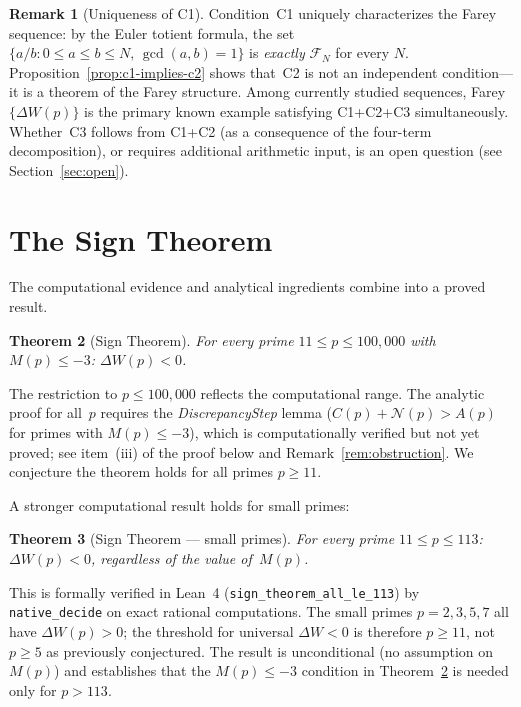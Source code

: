 \documentclass[11pt]{article}
\newtheorem{theorem}{Theorem}[section]
\theoremstyle{definition}
\newtheorem{remark}[theorem]{Remark}
\newcommand{\F}{\mathcal{F}}
\begin{document}
\begin{remark}[Uniqueness of C1]
Condition~C1 uniquely characterizes the Farey sequence: by the
Euler totient formula, the set $\{a/b : 0 \le a \le b \le N,\,
\gcd(a,b)=1\}$ is \emph{exactly} $\F_N$ for every $N$.
Proposition~\ref{prop:c1-implies-c2} shows that~C2 is not an
independent condition---it is a theorem of the Farey structure.
Among currently studied sequences, Farey $\{\Delta W(p)\}$ is the
primary known example satisfying C1+C2+C3 simultaneously.
Whether~C3 follows from C1+C2 (as a consequence of the four-term
decomposition), or requires additional arithmetic input, is an
open question (see Section~\ref{sec:open}).
\end{remark}

\section{The Sign Theorem}\label{sec:sign-theorem}

The computational evidence and analytical ingredients combine into
a proved result.

\begin{theorem}[Sign Theorem]\label{thm:sign}
For every prime $11 \le p \le 100{,}000$ with $M(p) \le -3$:
$\Delta W(p) < 0$.
\end{theorem}

\noindent The restriction to $p \le 100{,}000$ reflects the
computational range.  The analytic proof for all~$p$ requires
the \emph{DiscrepancyStep} lemma ($C(p) + \mathcal{N}(p) > A(p)$ for primes
with $M(p) \le -3$), which is computationally verified but not yet
proved; see item~(iii) of the proof below and
Remark~\ref{rem:obstruction}.  We conjecture the theorem holds
for all primes $p \ge 11$.

A stronger computational result holds for small primes:

\begin{theorem}[Sign Theorem --- small primes]\label{thm:sign-small}
For every prime $11 \le p \le 113$:
$\Delta W(p) < 0$,
regardless of the value of~$M(p)$.
\end{theorem}

\noindent This is formally verified in Lean~4
(\texttt{sign\_theorem\_all\_le\_113}) by
\texttt{native\_decide} on exact rational computations.
The small primes $p = 2, 3, 5, 7$ all have $\Delta W(p) > 0$;
the threshold for universal $\Delta W < 0$ is therefore
$p \ge 11$, not $p \ge 5$ as previously conjectured.
The result is unconditional (no assumption on~$M(p)$) and
establishes that the $M(p) \le -3$ condition in
Theorem~\ref{thm:sign} is needed only for $p > 113$.
\end{document}
